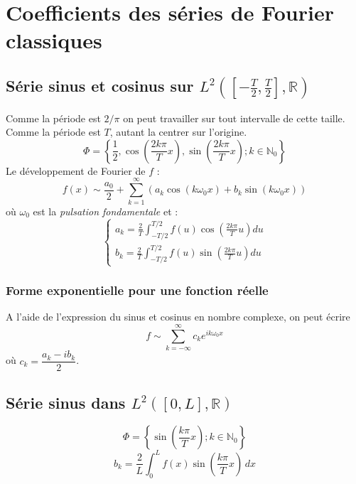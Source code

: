 \documentclass[11pt, a4paper, openany]{book}
\newcommand{\serie}{\sum_{k=1}^\infty}
\begin{document}
		\section{Coefficients des séries de Fourier classiques}
		\subsection{Série sinus et cosinus sur $L^2([-\frac{T}{2}, \frac{T}{2}], \mathbb{R})$}
		Comme la période est $2/\pi$ on peut travailler sur tout  intervalle de cette taille. Comme la période est $T$, autant la centrer sur l'origine.
		\begin{equation}
			\Phi = \left\{ \frac{1}{2}, \cos\left(\frac{2k\pi}{T}x\right), \sin\left(\frac{2k\pi}{T}x\right) ; k \in \mathbb{N}_0\right\}
		\end{equation}
		Le développement de Fourier de $f$ :
		\begin{equation}
			f(x) \sim \frac{a_0}{2} + \serie (a_k\cos(k\omega_0x) + b_k\sin(k\omega_0x))
		\end{equation}
		où $\omega_0$ est la \textit{pulsation fondamentale} et :
		\begin{equation}
			\left\{\begin{array}{l}
			a_k = \frac{2}{T}\int_{-T/2}^{T/2} f(u)\cos\left(\frac{2k\pi}{T}u\right)du\\
			b_k = \frac{2}{T}\int_{-T/2}^{T/2} f(u)\sin\left(\frac{2k\pi}{T}u\right)du
			\end{array}\right.
		\end{equation}
									
		\subsubsection{Forme exponentielle pour une fonction réelle}
		A l'aide de l'expression du sinus et cosinus en nombre complexe, on peut écrire 
		\begin{equation}
			f \sim \sum_{k=-\infty}^\infty c_ke^{ik\omega_0x}
		\end{equation}
		où $c_k = \dfrac{a_k - ib_k}{2}$.
									
		\subsection{Série sinus dans $L^2([0, L], \mathbb{R})$} 
		\begin{equation}
			\Phi = \left\{\sin\left(\frac{k\pi}{T}x\right) ; k \in \mathbb{N}_0\right\}
		\end{equation}
		\begin{equation}
			b_k=\frac{2}{L}\int_0^Lf(x)\sin\left(\frac{k\pi}{T}x\right)\,dx
		\end{equation}
\end{document}
